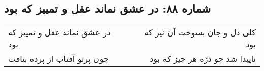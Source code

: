 \begin{center}
\section*{شماره ۸۸: در عشق نماند عقل و تمییز که بود}
\label{sec:088}
\begin{longtable}{l p{0.5cm} r}
در عشق نماند عقل و تمییز که بود
&&
کلی دل و جان بسوخت آن نیز که بود
\\
چون پرتو آفتاب از پرده بتافت
&&
ناپیدا شد چو ذرّه هر چیز که بود
\\
\end{longtable}
\end{center}
